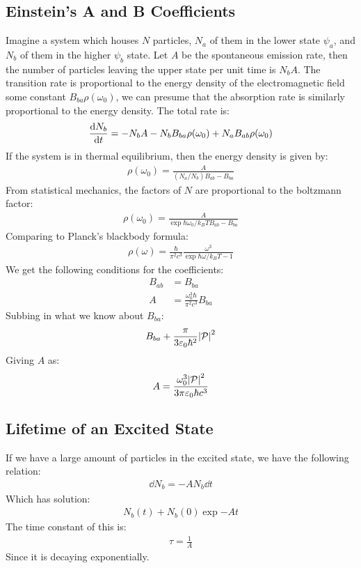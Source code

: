 \subsection{Einstein's A and B Coefficients}
Imagine a system which houses $N$ particles, $N_a$ of them in the lower state $\psi_a$, and $N_b$ of them in the higher $\psi_b$ state. Let $A$ be the spontaneous emission rate, then the number of particles leaving the upper state per unit time is $N_bA$. The transition rate is proportional to the energy density of the electromagnetic field some constant $B_{ba}\rho(\omega_0)$, we can presume that the absorption rate is similarly proportional to the energy density. The total rate is:
\begin{align*}
  \dv{N_b}{t}=-N_bA-N_bB_{ba}\rho(\omega_0)+N_aB_{ab}\rho(\omega_0)
\end{align*}
If the system is in thermal equilibrium, then the energy density is given by:
\begin{align*}
  \rho(\omega_0)=\frac{A}{(N_a/N_b)B_{ab}-B_{ba}}
\end{align*}
From statistical mechanics, the factors of $N$ are proportional to the boltzmann factor:
\begin{align*}
  \rho(\omega_0)=\frac{A}{\exp{\hbar\omega_0/k_BT}B_{ab}-B_{ba}}
\end{align*}
Comparing to Planck's blackbody formula:
\begin{align*}
  \rho(\omega)=\frac{\hbar}{\pi^2c^3}\frac{\omega^3}{\exp{\hbar\omega/k_BT}-1}
\end{align*}
We get the following conditions for the coefficients:
\begin{align*}
  B_{ab}&=B_{ba}\\
  A&=\frac{\omega_0^3\hbar}{\pi^2c^3}B_{ba}
\end{align*}
Subbing in what we know about $B_{ba}$:
\begin{align*}
  B_{ba}+\frac{\pi}{3\varepsilon_0\hbar^2}\abs{\vb{\mathcal{P}}}^2
\end{align*}
Giving $A$ as:
\begin{align*}
  A=\frac{\omega_0^3\abs{\vb{\mathcal{P}}}^2}{3\pi\varepsilon_0\hbar c^3}
\end{align*}
\subsection{Lifetime of an Excited State}
If we have a large amount of particles in the excited state, we have the following relation:
\begin{align*}
  \dd{N_b}=-AN_b\dd{t}
\end{align*}
Which has solution:
\begin{align*}
  N_b(t)+N_b(0)\exp{-At}
\end{align*}
The time constant of this is:
\begin{align*}
  \tau=\frac{1}{A}
\end{align*}
Since it is decaying exponentially.
